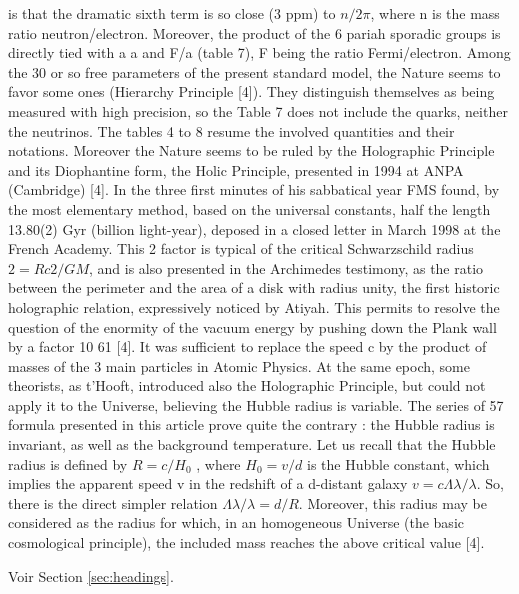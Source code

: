 \documentclass[a4paper,9pt]{article}
\begin{document}
is that the dramatic sixth term is so close (3 ppm) to $n/2\pi$, where n is the mass ratio
neutron/electron.
Moreover, the product of the 6 pariah sporadic groups is directly tied with a a and F/a (table 7), F
being the ratio Fermi/electron. Among the 30 or so free parameters of the present standard model,
the Nature seems to favor some ones (Hierarchy Principle [4]). They distinguish themselves as
being measured with high precision, so the Table 7 does not include the quarks, neither the neutrinos. The tables 4 to 8 resume the involved quantities and their notations. Moreover the Nature
seems to be ruled by the Holographic Principle and its Diophantine form, the Holic Principle,
presented in 1994 at ANPA (Cambridge) [4]. In the three first minutes of his sabbatical year FMS
found, by the most elementary method, based on the universal constants, half the length 13.80(2)
Gyr (billion light-year), deposed in a closed letter in March 1998 at the French Academy.
This 2 factor is typical of the critical Schwarzschild radius $2 = Rc 2 /GM$, and is also presented in
the Archimedes testimony, as the ratio between the perimeter and the area of a disk with radius
unity, the first historic holographic relation, expressively noticed by Atiyah. This permits to resolve
the question of the enormity of the vacuum energy by pushing down the Plank wall by a factor 10 61
[4]. It was sufficient to replace the speed c by the product of masses of the 3 main particles in
Atomic Physics. At the same epoch, some theorists, as t'Hooft, introduced also the Holographic
Principle, but could not apply it to the Universe, believing the Hubble radius is variable.
The series of 57 formula presented in this article prove quite the contrary : the Hubble radius is
invariant, as well as the background temperature. Let us recall that the Hubble radius is defined by
$R = c/H_0$ , where $H_0 = v/d$ is the Hubble constant, which implies the apparent speed v in the redshift
of a d-distant galaxy $v = c \Lambda\lambda/\lambda$. So, there is the direct simpler relation $\Lambda\lambda/\lambda = d/R$. Moreover, this
radius may be considered as the radius for which, in an homogeneous Universe (the basic
cosmological principle), the included mass reaches the above critical value [4].

Voir Section \ref{sec:headings}.
\end{document}
